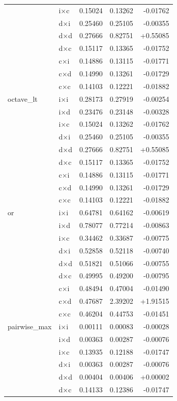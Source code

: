 \begin{longtable}{l l r r r}
   & i×c & 0.15024 & 0.13262 & -0.01762 \\
   & d×i & 0.25460 & 0.25105 & -0.00355 \\
   & d×d & 0.27666 & 0.82751 & +0.55085 \\
   & d×c & 0.15117 & 0.13365 & -0.01752 \\
   & c×i & 0.14886 & 0.13115 & -0.01771 \\
   & c×d & 0.14990 & 0.13261 & -0.01729 \\
   & c×c & 0.14103 & 0.12221 & -0.01882 \\
\midrule
  octave\_lt & i×i & 0.28173 & 0.27919 & -0.00254 \\
   & i×d & 0.23476 & 0.23148 & -0.00328 \\
   & i×c & 0.15024 & 0.13262 & -0.01762 \\
   & d×i & 0.25460 & 0.25105 & -0.00355 \\
   & d×d & 0.27666 & 0.82751 & +0.55085 \\
   & d×c & 0.15117 & 0.13365 & -0.01752 \\
   & c×i & 0.14886 & 0.13115 & -0.01771 \\
   & c×d & 0.14990 & 0.13261 & -0.01729 \\
   & c×c & 0.14103 & 0.12221 & -0.01882 \\
\midrule
  or & i×i & 0.64781 & 0.64162 & -0.00619 \\
   & i×d & 0.78077 & 0.77214 & -0.00863 \\
   & i×c & 0.34462 & 0.33687 & -0.00775 \\
   & d×i & 0.52858 & 0.52118 & -0.00740 \\
   & d×d & 0.51821 & 0.51066 & -0.00755 \\
   & d×c & 0.49995 & 0.49200 & -0.00795 \\
   & c×i & 0.48494 & 0.47004 & -0.01490 \\
   & c×d & 0.47687 & 2.39202 & +1.91515 \\
   & c×c & 0.46204 & 0.44753 & -0.01451 \\
\midrule
  pairwise\_max & i×i & 0.00111 & 0.00083 & -0.00028 \\
   & i×d & 0.00363 & 0.00287 & -0.00076 \\
   & i×c & 0.13935 & 0.12188 & -0.01747 \\
   & d×i & 0.00363 & 0.00287 & -0.00076 \\
   & d×d & 0.00404 & 0.00406 & +0.00002 \\
   & d×c & 0.14133 & 0.12386 & -0.01747 \\

\end{longtable}
